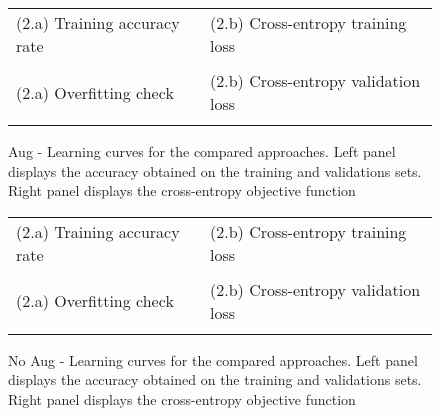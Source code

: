 \begin{figure*}[htb]
\begin{center}
\begin{tabular}{ll}
(2.a) Training accuracy rate&(2.b) Cross-entropy training loss\\
&
\\
(2.a) Overfitting check&(2.b) Cross-entropy validation loss\\
&
\\
\end{tabular}%
\caption{Aug - Learning curves for the compared approaches. Left panel displays the accuracy obtained on the training and validations sets. Right panel displays the cross-entropy objective function}
\end{center}
\label{fig:learning}
\end{figure*}

\begin{figure*}[htb]
\begin{center}
\begin{tabular}{ll}
(2.a) Training accuracy rate&(2.b) Cross-entropy training loss\\
&
\\
(2.a) Overfitting check&(2.b) Cross-entropy validation loss\\
&
\\
\end{tabular}%
\caption{No Aug - Learning curves for the compared approaches. Left panel displays the accuracy obtained on the training and validations sets. Right panel displays the cross-entropy objective function}
\end{center}
\label{fig:learning}
\end{figure*}
